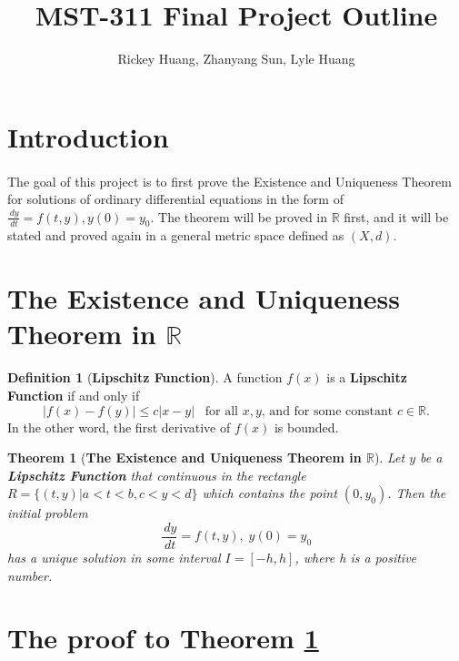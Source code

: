 \documentclass{article}
\title{MST-311 Final Project Outline}
\author{Rickey Huang, Zhanyang Sun, Lyle Huang}
\newtheorem{theorem}{Theorem}[section]
\theoremstyle{definition}
\newtheorem{definition}{Definition}[section]
\theoremstyle{remark}
\begin{document}
\maketitle

\section{Introduction}

\paragraph{  }

The goal of this project is to first prove the Existence and Uniqueness Theorem for solutions of ordinary differential equations in the form of $\tfrac{\,dy}{\,dt} = f(t,y), y(0) = y_0$. The theorem will be proved in $\mathbb{R}$ first, and it will be stated and proved again in a general metric space defined as $(X,d)$.

\section{The Existence and Uniqueness Theorem in $\mathbb{R}$}

\begin{definition}[\textbf{Lipschitz Function}]\label{def:Lip}
    A function $f(x)$ is a \textbf{Lipschitz Function} if and only if 
    \begin{equation}\label{eqn:Lip}
        \lvert f(x) - f(y) \rvert \leq c \lvert x - y \rvert \;\;\; \text{for all $x, y$, and for some constant $c \in \mathbb{R}$}.
    \end{equation}
    In the other word, the first derivative of $f(x)$ is bounded.
\end{definition}
 
\begin{theorem}[\textbf{The Existence and Uniqueness Theorem in $\mathbb{R}$}]
\label{thm:EUT}
Let $y$ be a \textbf{Lipschitz Function} that continuous in the rectangle $R = \{(t,y)|a < t < b, c < y < d\}$ which contains the point $(0, y_0)$. Then the initial problem
    \begin{equation}\label{eqn:ode}
        \dfrac{\,dy}{\,dt} = f(t,y),\; y(0) = y_0
    \end{equation}
has a unique solution in some interval $I = [-h, h]$, where h is a positive number.
\end{theorem}

\section{The proof to Theorem \ref{thm:EUT}}
\end{document}
